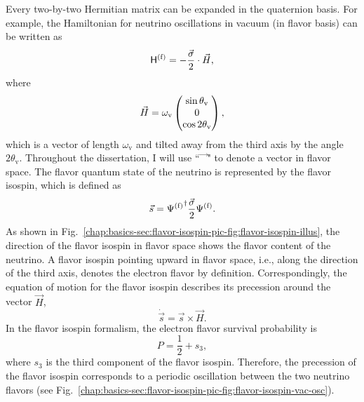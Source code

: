 Every two-by-two Hermitian matrix can be expanded in the quaternion basis. For example, the Hamiltonian for neutrino oscillations in vacuum (in flavor basis) can be written as
\begin{equation}
\mathsf H^{(\mathrm f)} = - \frac{\vec{\sigma} }{2}\cdot {\vec{H}},
\end{equation}
where
\begin{align*}
{\vec H} =  \omega_\mathrm v\begin{pmatrix}
 \sin \theta_\mathrm v\\
0\\
\cos 2\theta_{\mathrm v}
\end{pmatrix},
\end{align*}
which is a vector of length $\omega_{\mathrm v}$ and tilted away from the third axis by the angle $2\theta_{\mathrm v}$.
Throughout the dissertation, I will use ``$\vec{\phantom{x~}}$" to denote a vector in flavor space.
The flavor quantum state of the neutrino is represented by the flavor isospin, which is defined as
\begin{equation}
    \vec s = {\Psi^{(\mathrm f)}}^{\dagger} \frac{\vec{\sigma} }{2} \Psi^{(\mathrm f)}.
\end{equation}
As shown in Fig.~\ref{chap:basics-sec:flavor-isospin-pic-fig:flavor-isospin-illus}, the direction of the flavor isospin in flavor space shows the flavor content of the neutrino. A flavor isospin pointing upward in flavor space, i.e., along the direction of the third axis, denotes the electron flavor by definition.
Correspondingly, the equation of motion for the flavor isospin describes its precession around the vector $\vec{H}$,
\begin{equation}
\dot{\vec{s}} = {\vec{s}} \times \vec{H}.
\label{chap:basics-sec:flavor-isospin-pic-eqn:eom-precession}
\end{equation}
In the flavor isospin formalism, the electron flavor survival probability is
\begin{equation*}
P = \frac{1}{2} + s_3,
\label{chap:basics-sec:flavor-isospin-pic-eqn:probability-flavor}
\end{equation*}
where $s_3$ is the third component of the flavor isospin.
Therefore, the precession of the flavor isospin corresponds to a periodic oscillation between the two neutrino flavors (see Fig.~\ref{chap:basics-sec:flavor-isospin-pic-fig:flavor-isospin-vac-osc}).
